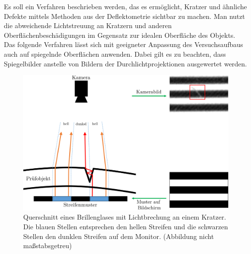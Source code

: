 Es soll ein Verfahren beschrieben werden, das es ermöglicht, Kratzer und ähnliche Defekte mittels Methoden aus der Deflektometrie sichtbar zu machen.
Man nutzt die abweichende Lichtstreuung an Kratzern und anderen Oberflächenbeschädigungen im Gegensatz zur idealen Oberfläche des Objekts.
Das folgende Verfahren lässt sich mit geeigneter Anpassung des Versuchsaufbaus auch auf spiegelnde Oberflächen anwenden.
Dabei gilt es zu beachten, dass Spiegelbilder anstelle von Bildern der Durchlichtprojektionen ausgewertet werden.

\begin{figure}[H]
	\centering
	\includegraphics[width=\textwidth]{03_sichtpruefungDurchLichtstreuung/verfahren/figures/scratch_reflection_with_images}
	\caption[Lichtbrechung an einem Kratzer]{Querschnitt eines Brillenglases mit Lichtbrechung an einem Kratzer. Die blauen Stellen entsprechen den hellen Streifen und die schwarzen Stellen den dunklen Streifen auf dem Monitor. (Abbildung nicht maßstabsgetreu)}
	\label{img:lightreflection}
\end{figure}

